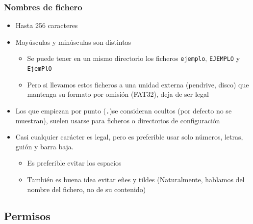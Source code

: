 \documentclass[ucs]{beamer}
\begin{document}
\begin{frame}[fragile]

\frametitle{Nombres de fichero}
  \begin{itemize}
    \item Hasta 256 caracteres
    \item Mayúsculas y minúsculas son distintas
          \begin{itemize}
          \item Se puede tener en un mismo directorio los ficheros
                   \verb|ejemplo|, \verb|EJEMPLO| y \verb|EjemPlO|
          \item Pero si llevamos estos ficheros a una unidad externa
            (pendrive, disco) que mantenga su formato por omisión
             (FAT32), deja de ser legal
          \end{itemize}
    \item
Los que empiezan por punto (\verb|.|)se consideran ocultos
    (por defecto no se muestran), suelen usarse para ficheros o
    directorios de configuración
    \item Casi cualquier carácter es legal, pero es preferible usar solo números, letras, guión y barra baja. 
  \begin{itemize}
    \item Es preferible evitar los espacios
   \item También es buena idea evitar eñes y tildes (Naturalmente, hablamos del nombre del fichero, no de su contenido)
  \end{itemize}
  
%
  \end{itemize}
\end{frame}





\subsection{Permisos}
\end{document}
